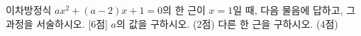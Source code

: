 이차방정식 $ax^2+(a-2)x+1=0$의 한 근이 $x=1$일 때, 다음 물음에 답하고, 그 과정을 서술하시오.  \mbox{[6점]}
 $a$의 값을 구하시오. (2점)
 다른 한 근을 구하시오. (4점)
